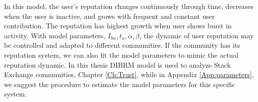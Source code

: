 In this model, the user's reputation changes continuously through time, decreases when the user is inactive, and grows with frequent and constant user contribution. The reputation has highest growth when user shows burst in activity. With model parameters, $I_{bn}, t_a, \alpha, \beta$, the dynamic of user reputation may be controlled and adapted to different communities. If the community has its reputation system, we can also fit the model parameters to mimic the actual reputation dynamic. In this thesis DIBRM model is used to analyze Stack Exchange communities, Chapter \ref{Ch:Trust}, while in Appendix \ref{App:parameters}, we suggest the procedure to estimate the model parameters for this specific system. 














